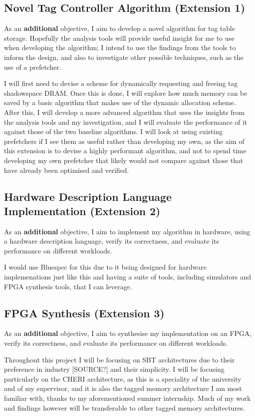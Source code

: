 \documentclass[10pt,a4paper]{article}
\begin{document}
\subsection*{Novel Tag Controller Algorithm (Extension 1)}
As an \textbf{additional} objective, I aim to develop a novel algorithm for tag table storage. Hopefully the analysis tools will provide useful insight for me to use when developing the algorithm; I intend to use the findings from the tools to inform the design, and also to investigate other possible techniques, such as the use of a prefetcher.

I will first need to devise a scheme for dynamically requesting and freeing tag shadowspace DRAM. Once this is done, I will explore how much memory can be saved by a basic algorithm that makes use of the dynamic allocation scheme. After this, I will develop a more advanced algorithm that uses the insights from the analysis tools and my investigation, and I will evaluate the performance of it against those of the two baseline algorithms. I will look at using existing prefetchers if I see them as useful rather than developing my own, as the aim of this extension is to devise a highly performant algorithm, and not to spend time developing my own prefetcher that likely would not compare against those that have already been optimised and verified.

\subsection*{Hardware Description Language Implementation (Extension 2)}
As an \textbf{additional} objective, I aim to implement my algorithm in hardware, using a hardware description language, verify its correctness, and evaluate its performance on different workloads.

I would use Bluespec for this due to it being designed for hardware implemenations just like this and having a suite of tools, including simulators and FPGA synthesis tools, that I can leverage.

\subsection*{FPGA Synthesis (Extension 3)}
As an \textbf{additional} objective, I aim to synthesise my implementation on an FPGA, verify its correctness, and evaluate its performance on different workloads.


Throughout this project I will be focusing on SBT architectures due to their preference in industry [SOURCE?] and their simplicity. I will be focusing particularly on the CHERI architecture, as this is a speciality of the university and of my supervisor, and it is also the tagged memory architecture I am most familiar with, thanks to my aforementioned summer internship. Much of my work and findings however will be transferable to other tagged memory architectures.
\end{document}
